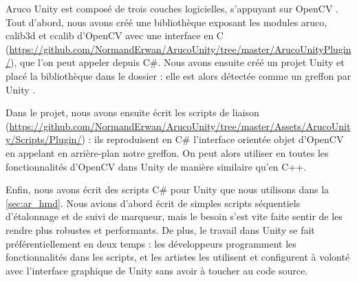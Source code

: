 
Aruco Unity est composé de trois couches logicielles, s'appuyant sur OpenCV . Tout d'abord, nous avons créé une bibliothèque exposant les modules aruco, calib3d et ccalib d'OpenCV avec une interface en C (\url{https://github.com/NormandErwan/ArucoUnity/tree/master/ArucoUnityPlugin/}), que l'on peut appeler depuis C\#. Nous avons ensuite créé un projet Unity et placé la bibliothèque dans le dossier  : elle est alors détectée comme un greffon par Unity .


Dans le projet, nous avons ensuite écrit les scripts de liaison (\url{https://github.com/NormandErwan/ArucoUnity/tree/master/Assets/ArucoUnity/Scripts/Plugin/}) : ils reproduisent en C\# l'interface orientée objet d'OpenCV en appelant en arrière-plan notre greffon. On peut alors utiliser en toutes les fonctionnalités d'OpenCV dans Unity de manière similaire qu'en C++.

Enfin, nous avons écrit des scripts C\# pour Unity que nous utilisons dans la \autoref{sec:ar_hmd}. Nous avions d'abord écrit de simples scripts séquentiels d'étalonnage et de suivi de marqueur, mais le besoin s'est vite faite sentir de les rendre plus robustes et performants. De plus, le travail dans Unity se fait préférentiellement en deux temps : les développeurs programment les fonctionnalités dans les scripts, et les artistes les utilisent et configurent à volonté avec l'interface graphique de Unity sans avoir à toucher au code source.

